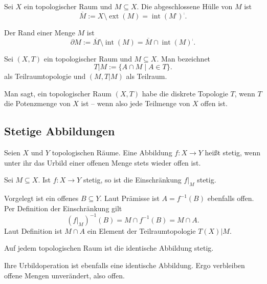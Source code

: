 \begin{Definition}\newlinefirst
Sei $X$ ein topologischer Raum und $M\subseteq X$. Die abgeschlossene Hülle von $M$ ist%
\[\overline M := X\setminus\operatorname{ext}(M) = \operatorname{int}(M^\comp)^\comp.\]
\end{Definition}

\begin{Definition}[Rand]
Der Rand einer Menge $M$ ist
\[\partial M := \overline M\setminus\operatorname{int}(M)
= \overline M\cap\operatorname{int}(M)^\comp.\]
\end{Definition}

\begin{Definition}[Teilraumtopologie]\newlinefirst
Sei $(X,T)$ ein topologischer Raum und $M\subseteq X$. Man bezeichnet
\[T|M := \{A\cap M\mid A\in T\}.\]
als Teilraumtopologie und $(M,T|M)$ als Teilraum.
\end{Definition}

\begin{Definition}\newlinefirst
Man sagt, ein topologischer Raum $(X,T)$ habe die diskrete Topologie $T$,
wenn $T$ die Potenzmenge von $X$ ist -- wenn also jede Teilmenge
von $X$ offen ist.
\end{Definition}

\subsection{Stetige Abbildungen}

\begin{Definition}\newlinefirst
Seien $X$ und $Y$ topologischen Räume. Eine Abbildung $f\colon X\to Y$
heißt stetig, wenn unter ihr das Urbild einer offenen Menge stets
wieder offen ist.
\end{Definition}

\begin{Satz}
Sei $M\subseteq X$. Ist $f\colon X\to Y$ stetig, so ist
die Einschränkung $f|_M$ stetig.
\end{Satz}
\begin{Beweis}
Vorgelegt ist ein offenes $B\subseteq Y$. Laut Prämisse ist $A=f^{-1}(B)$
ebenfalls offen. Per Definition der Einschränkung gilt
\[(f|_M)^{-1}(B) = M\cap f^{-1}(B) = M\cap A.\]
Laut Definition ist $M\cap A$ ein Element der Teilraumtopologie $T(X)|M$.\,\qedsymbol
\end{Beweis}

\begin{Satz}
Auf jedem topologischen Raum ist die identische Abbildung stetig.
\end{Satz}
\begin{Beweis}
Ihre Urbildoperation ist ebenfalls eine identische Abbildung. Ergo
verbleiben offene Mengen unverändert, also offen.\,\qedsymbol
\end{Beweis}


